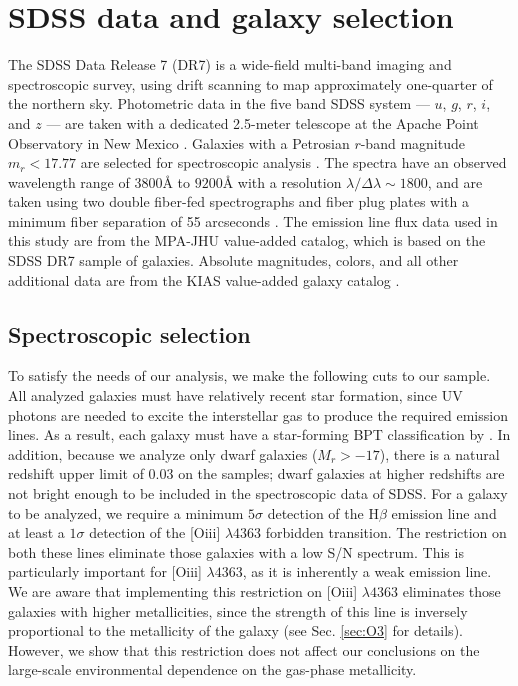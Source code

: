 \section[SDSS Data]{SDSS data and galaxy selection}\label{sec:Data}
The SDSS Data Release 7 (DR7) \citep{Abazajian09} is a wide-field multi-band 
imaging and spectroscopic survey, using drift scanning to map approximately 
one-quarter of the northern sky.  Photometric data in the five band SDSS system 
--- $u$, $g$, $r$, $i$, and $z$ --- are taken with a dedicated 2.5-meter 
telescope at the Apache Point Observatory in New Mexico \citep{Fukugita96, 
Gunn98}.  Galaxies with a Petrosian $r$-band magnitude $m_r < 17.77$ are 
selected for spectroscopic analysis \citep{Lupton01, Strauss02}.  The spectra 
have an observed wavelength range of $3800\text{\AA}$ to $9200\text{\AA}$ with a 
resolution $\lambda / \Delta \lambda \sim 1800$, and are taken using two 
double fiber-fed spectrographs and fiber plug plates with a minimum fiber 
separation of 55 arcseconds \citep{Blanton03}.  The emission line flux data used 
in this study are from the MPA-JHU value-added catalog, which is based on the 
SDSS DR7 sample of galaxies.  Absolute magnitudes, colors, and all other 
additional data are from the KIAS value-added galaxy catalog \citep{Choi10}.


\subsection{Spectroscopic selection}

To satisfy the needs of our analysis, we make the following cuts to our sample.  
All analyzed galaxies must have relatively recent star formation, since UV 
photons are needed to excite the interstellar gas to produce the required 
emission lines.  As a result, each galaxy must have a star-forming BPT 
classification by \cite{Brinchmann04}.  In addition, because we analyze only 
dwarf galaxies ($M_r > -17$), there is a natural redshift upper limit of 0.03 on 
the samples; dwarf galaxies at higher redshifts are not bright enough to be 
included in the spectroscopic data of SDSS.  For a galaxy to be analyzed, we 
require a minimum $5\sigma$ detection of the H$\beta$ emission line and at least 
a $1\sigma$ detection of the [O{\sc iii}] $\lambda 4363$ forbidden transition.  
The restriction on both these lines eliminate those galaxies with a low S/N 
spectrum.  This is particularly important for [O{\sc iii}] $\lambda 4363$, as it 
is inherently a weak emission line.  We are aware that implementing this 
restriction on [O{\sc iii}] $\lambda 4363$ eliminates those galaxies with higher 
metallicities, since the strength of this line is inversely proportional to the 
metallicity of the galaxy (see Sec. \ref{sec:O3} for details).  However, we show 
that this restriction does not affect our conclusions on the large-scale 
environmental dependence on the gas-phase metallicity.

